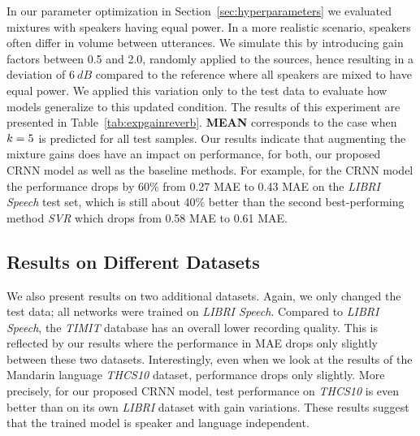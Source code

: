 In our parameter optimization in Section~\ref{sec:hyperparameters} we evaluated  mixtures with speakers having equal power.
In a more realistic scenario, speakers often differ in volume between utterances.
We simulate this by introducing gain factors between 0.5 and 2.0, randomly applied to the sources, hence resulting in a deviation of $6~dB$ compared to the reference where all speakers are mixed to have equal power.
We applied this variation only to the test data to evaluate how models generalize to this updated condition.
The results of this experiment are presented in Table~\ref{tab:expgainreverb}.
\textbf{MEAN} corresponds to the case when \(k = 5\) is predicted for all test samples.
Our results indicate that augmenting the mixture gains does have an impact on performance, for both, our proposed CRNN model as well as the baseline methods.
For example, for the CRNN model the performance drops by 60\% from 0.27 MAE to 0.43 MAE on the \emph{LIBRI Speech} test set, which is still about 40\% better than the second best-performing method \emph{SVR} which drops from 0.58 MAE to 0.61 MAE.\@

\subsection{Results on Different Datasets}%
\label{ssec:r_datasets}
We also present results on two additional datasets.
Again, we only changed the test data; all networks were trained on \emph{LIBRI Speech}.
Compared to \emph{LIBRI Speech}, the \emph{TIMIT} database has an overall lower recording quality.
This is reflected by our results where the performance in MAE drops only slightly between these two datasets.
Interestingly, even when we look at the results of the Mandarin language \emph{THCS10} dataset, performance drops only slightly.
More precisely, for our proposed CRNN model, test performance on \emph{THCS10} is even better than on its own \emph{LIBRI} dataset with gain variations.
These results suggest that the trained model is speaker and language independent.


